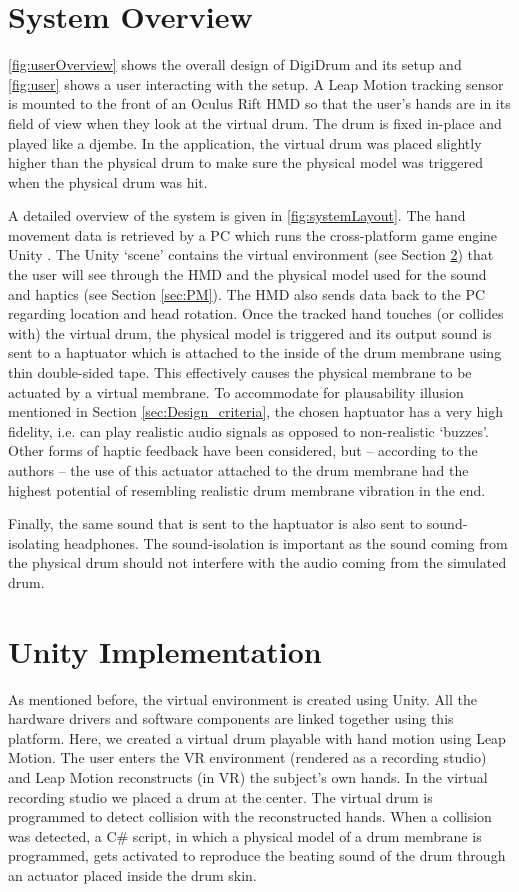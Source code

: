 \documentclass{article}
\begin{document}
\section{System Overview} \label{sec:sys}

\autoref{fig:userOverview} shows the overall design of DigiDrum and its setup and \autoref{fig:user} shows a user interacting with the setup. A Leap Motion tracking sensor is mounted to the front of an Oculus Rift HMD so that the user's hands are in its field of view when they look at the virtual drum. The drum is fixed in-place and played like a djembe. In the application, the virtual drum was placed slightly higher than the physical drum to make sure the physical model was triggered when the physical drum was hit.

A detailed overview of the system is given in \autoref{fig:systemLayout}. The hand movement data is retrieved by a PC which runs the cross-platform game engine Unity \cite{unity}. The Unity `scene' contains the virtual environment (see Section \ref{sec:unity}) that the user will see through the HMD and the physical model used for the sound and haptics (see Section \ref{sec:PM}). The HMD also sends data back to the PC regarding location and head rotation. Once the tracked hand touches (or collides with) the virtual drum, the physical model is triggered and its output sound is sent to a haptuator which is attached to the inside of the drum membrane using thin double-sided tape. This effectively causes the physical membrane to be actuated by a virtual membrane. To accommodate for plausability illusion mentioned in Section \ref{sec:Design_criteria}, the chosen haptuator has a very high fidelity, i.e. can play realistic audio signals as opposed to non-realistic `buzzes'. Other forms of haptic feedback have been considered, but -- according to the authors -- the use of this actuator attached to the drum membrane had the highest potential of resembling realistic drum membrane vibration in the end.

Finally, the same sound that is sent to the haptuator is also sent to sound-isolating headphones. The sound-isolation is important as the sound coming from the physical drum should not interfere with the audio coming from the simulated drum.

\section{Unity Implementation}\label{sec:unity}
As mentioned before, the virtual environment is  created using Unity. All the hardware drivers and software components are linked together using this platform. Here, we created a virtual drum playable with hand motion using Leap Motion. The user enters the VR environment (rendered as a recording studio) and Leap Motion reconstructs (in VR) the subject's own hands. In the virtual recording studio we placed a drum at the center. The virtual drum is programmed to detect collision with the reconstructed hands. When a collision was detected, a C\# script, in which a physical model of a drum membrane is programmed, gets activated to reproduce the beating sound of the drum through an actuator placed inside the drum skin.
\end{document}
